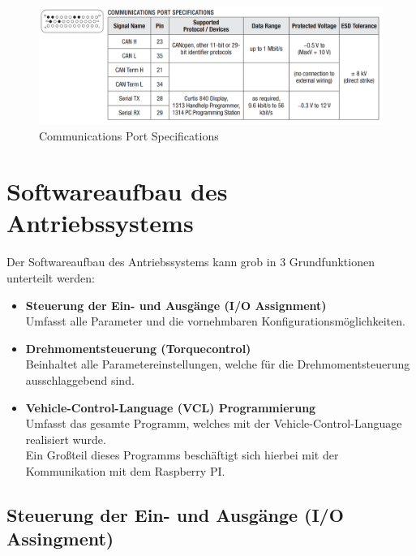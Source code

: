 \begin{figure}[H]
	\begin{center}
		\includegraphics[width=\textwidth]{figures/antrieb/Communications_Port_Specifications.png}
		\caption{Communications Port Specifications}
	\end{center}
\end{figure}



\newpage



\section{Softwareaufbau des Antriebssystems}
Der Softwareaufbau des Antriebssystems kann grob in 3 Grundfunktionen unterteilt werden:
\\[5mm]
\begin{itemize}
	\item \textbf{Steuerung der Ein- und Ausgänge (I/O Assignment)}
	\\ \medskip Umfasst alle Parameter und die vornehmbaren Konfigurationsmöglichkeiten.
	\medskip
	\item \textbf{Drehmomentsteuerung (Torquecontrol)}
	\\ \medskip Beinhaltet alle Parametereinstellungen, welche für die Drehmomentsteuerung ausschlaggebend sind.
	\medskip
	\item \textbf{Vehicle-Control-Language (VCL) Programmierung}
	\\ \medskip Umfasst das gesamte Programm, welches mit der Vehicle-Control-Language realisiert wurde.
	\\ Ein Großteil dieses Programms beschäftigt sich hierbei mit der Kommunikation mit dem Raspberry PI.
\end{itemize}

\subsection{Steuerung der Ein- und Ausgänge (I/O Assingment)}
